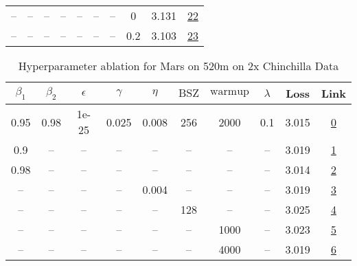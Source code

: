 \begin{table}[H]
\begin{tabular}{cccccccccc}
-- & -- & -- & -- & -- & -- & -- & 0 & 3.131 & \href{https://wandb.ai/stanford-mercury/optimizer-scaling/runs/sweep-520m-10B-mars957dd2lr0.008-wd0-minlr0-warmup2000-b10.95-b2-d9df97}{22} \\
-- & -- & -- & -- & -- & -- & -- & 0.2 & 3.103 & \href{https://wandb.ai/stanford-mercury/optimizer-scaling/runs/sweep-520m-10B-marsca8afflr0.008-wd0.2-minlr0-warmup2000-b10.95--23909d}{23} \\
\bottomrule
\end{tabular}
\end{table}

\begin{table}[H]
\centering
\caption{Hyperparameter ablation for Mars on 520m on 2x Chinchilla Data}
\label{tab:ablation_mars_520m_2}
\begin{tabular}{cccccccccc}
\toprule
$\beta_1$ & $\beta_2$ & $\epsilon$ & $\gamma$ & $\eta$ & $\mathrm{BSZ}$ & $\mathrm{warmup}$ & $\lambda$ & Loss & Link \\
\midrule
0.95 & 0.98 & 1e-25 & 0.025 & 0.008 & 256 & 2000 & 0.1 & 3.015 & \href{https://wandb.ai/stanford-mercury/optimizer-scaling/runs/sweep-520m-21B-mars1ddcddlr0.008-wd0.1-minlr0-warmup2000-b10.95--e9c503}{0} \\
\midrule
0.9 & -- & -- & -- & -- & -- & -- & -- & 3.019 & \href{https://wandb.ai/stanford-mercury/optimizer-scaling/runs/sweep-520m-21B-mars95d994lr0.008-wd0.1-minlr0-warmup2000-b10.9-b-82302a}{1} \\
0.98 & -- & -- & -- & -- & -- & -- & -- & 3.014 & \href{https://wandb.ai/stanford-mercury/optimizer-scaling/runs/sweep-520m-21B-mars1125cblr0.008-wd0.1-minlr0-warmup2000-b10.98--1a971c}{2} \\
-- & -- & -- & -- & 0.004 & -- & -- & -- & 3.019 & \href{https://wandb.ai/stanford-mercury/optimizer-scaling/runs/sweep-520m-21B-mars79301dlr0.004-wd0.1-minlr0-warmup2000-b10.95--3c45f1}{3} \\
-- & -- & -- & -- & -- & 128 & -- & -- & 3.025 & \href{https://wandb.ai/stanford-mercury/optimizer-scaling/runs/sweep-520m-21B-mars50507flr0.008-wd0.1-minlr0-warmup2000-b10.95--4cefa8}{4} \\
-- & -- & -- & -- & -- & -- & 1000 & -- & 3.023 & \href{https://wandb.ai/stanford-mercury/optimizer-scaling/runs/sweep-520m-21B-marse5a362lr0.008-wd0.1-minlr0-warmup1000-b10.95--03de08}{5} \\
-- & -- & -- & -- & -- & -- & 4000 & -- & 3.019 & \href{https://wandb.ai/stanford-mercury/optimizer-scaling/runs/sweep-520m-21B-mars6baa9blr0.008-wd0.1-minlr0-warmup4000-b10.95--dcbf07}{6} \\
\bottomrule
\end{tabular}
\end{table}

